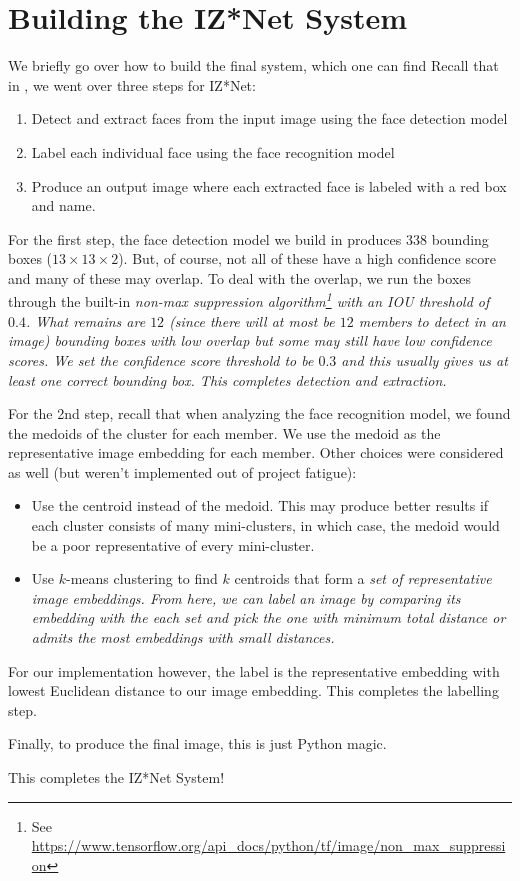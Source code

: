 \section{Building the IZ*Net System}\label{Section:Building-the-IZNet-System}

We briefly go over how to build the final system, which one can find \href{}{}
Recall that in , we went over three steps for IZ*Net:
\begin{enumerate}
    \item Detect and extract faces from the input image using the face detection model
    \item Label each individual face using the face recognition model
    \item Produce an output image where each extracted face is labeled with a red box and name.
\end{enumerate}

For the first step, the face detection model we build in  produces $338$ bounding boxes ($13 \times 13 \times 2$).
But, of course, not all of these have a high confidence score and many of these may overlap.
To deal with the overlap, we run the boxes through the built-in \it{non-max suppression} algorithm\footnote{See \url{https://www.tensorflow.org/api_docs/python/tf/image/non_max_suppression}} with an IOU threshold of $0.4$.
What remains are $12$ (since there will at most be $12$ members to detect in an image) bounding boxes with low overlap but some may still have low confidence scores.
We set the confidence score threshold to be $0.3$ and this usually gives us at least one correct bounding box.
This completes detection and extraction.

For the 2nd step, recall that when analyzing the face recognition model, we found the medoids of the cluster for each member.
We use the medoid as the representative image embedding for each member.
Other choices were considered as well (but weren't implemented out of project fatigue):
\begin{itemize}
    \item Use the centroid instead of the medoid.
    This may produce better results if each cluster consists of many mini-clusters, in which case, the medoid would be a poor representative of every mini-cluster.

    \item Use $k$-means clustering to find $k$ centroids that form a \it{set} of representative image embeddings.
    From here, we can label an image by comparing its embedding with the each set and pick the one with minimum total distance or admits the most embeddings with small distances.
\end{itemize}
For our implementation however, the label is the representative embedding with lowest Euclidean distance to our image embedding.
This completes the labelling step.

Finally, to produce the final image, this is just Python magic.

This completes the IZ*Net System!